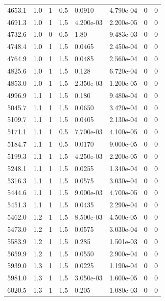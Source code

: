 \documentclass[preview]{standalone}
\begin{document}
{{{\begin{tabular}{L{1.2cm}C{1.2cm} C{0.3cm}C{0.5cm} C{1.4cm}C{1.4cm} C{1.4cm}C{1.4cm}}
  4653.1  &   1.0  & 1     & 0.5 &  0.0910  & 4.790e-04  & 0 &  0   \\ 
  4691.3  &   1.0  & 1     & 1.5 &  4.200e-03  & 2.200e-05  & 0 &  0   \\ 
  4732.6  &   1.0  & 0     & 0.5 &  1.80  & 9.483e-03  & 0 &  0   \\ 
  4748.4  &   1.0  & 1     & 1.5 &  0.0465  & 2.450e-04  & 0 &  0   \\ 
  4764.9  &   1.0  & 1     & 1.5 &  0.0485  & 2.560e-04  & 0 &  0   \\ 
  4825.6  &   1.0  & 1     & 1.5 &  0.128  & 6.720e-04  & 0 &  0   \\ 
  4853.0  &   1.0  & 1     & 1.5 &  2.350e-03  & 1.200e-05  & 0 &  0   \\ 
  4996.9  &   1.1  & 1     & 1.5 &  0.180  & 9.480e-04  & 0 &  0   \\ 
  5045.7  &   1.1  & 1     & 1.5 &  0.0650  & 3.420e-04  & 0 &  0   \\ 
  5109.7  &   1.1  & 1     & 1.5 &  0.0405  & 2.130e-04  & 0 &  0   \\ 
  5171.1  &   1.1  & 1     & 0.5 &  7.700e-03  & 4.100e-05  & 0 &  0   \\ 
  5184.7  &   1.1  & 1     & 0.5 &  0.0170  & 9.000e-05  & 0 &  0   \\ 
  5199.3  &   1.1  & 1     & 1.5 &  4.250e-03  & 2.200e-05  & 0 &  0   \\ 
  5248.1  &   1.1  & 1     & 1.5 &  0.0255  & 1.340e-04  & 0 &  0   \\ 
  5316.3  &   1.1  & 1     & 1.5 &  0.0575  & 3.030e-04  & 0 &  0   \\ 
  5444.6  &   1.1  & 1     & 1.5 &  9.000e-03  & 4.700e-05  & 0 &  0   \\ 
  5451.3  &   1.1  & 1     & 1.5 &  0.0435  & 2.290e-04  & 0 &  0   \\ 
  5462.0  &   1.2  & 1     & 1.5 &  8.500e-03  & 4.500e-05  & 0 &  0   \\ 
  5473.0  &   1.2  & 1     & 1.5 &  0.0575  & 3.030e-04  & 0 &  0   \\ 
  5583.9  &   1.2  & 1     & 1.5 &  0.285  & 1.501e-03  & 0 &  0   \\ 
  5659.9  &   1.2  & 1     & 1.5 &  0.0550  & 2.900e-04  & 0 &  0   \\ 
  5939.0  &   1.3  & 1     & 1.5 &  0.0225  & 1.190e-04  & 0 &  0   \\ 
  5981.0  &   1.3  & 1     & 1.5 &  3.050e-03  & 1.600e-05  & 0 &  0   \\ 
  6020.5  &   1.3  & 1     & 1.5 &  0.205  & 1.080e-03  & 0 &  0   \\ 

\end{tabular}}}}
\end{document}
